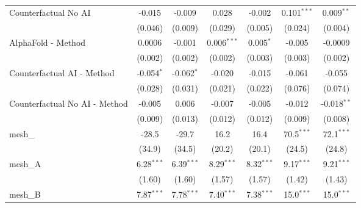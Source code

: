 \begin{tabular}{lcccccc}
   Counterfactual No AI                                        & -0.015         & -0.009        & 0.028         & -0.002        & 0.101$^{***}$ & 0.009$^{**}$\\   
                                                               & (0.046)        & (0.009)       & (0.029)       & (0.005)       & (0.024)       & (0.004)\\   
   AlphaFold - Method                                          & 0.0006         & -0.001        & 0.006$^{***}$ & 0.005$^{*}$   & -0.005        & -0.0009\\   
                                                               & (0.002)        & (0.002)       & (0.002)       & (0.003)       & (0.003)       & (0.002)\\   
   Counterfactual AI - Method                                  & -0.054$^{*}$   & -0.062$^{*}$  & -0.020        & -0.015        & -0.061        & -0.055\\   
                                                               & (0.028)        & (0.031)       & (0.021)       & (0.022)       & (0.076)       & (0.074)\\   
   Counterfactual No AI - Method                               & -0.005         & 0.006         & -0.007        & -0.005        & -0.012        & -0.018$^{**}$\\   
                                                               & (0.009)        & (0.013)       & (0.012)       & (0.012)       & (0.009)       & (0.008)\\   
   mesh\_                                                      & -28.5          & -29.7         & 16.2          & 16.4          & 70.5$^{***}$  & 72.1$^{***}$\\   
                                                               & (34.9)         & (34.5)        & (20.2)        & (20.1)        & (24.5)        & (24.8)\\   
   mesh\_A                                                     & 6.28$^{***}$   & 6.39$^{***}$  & 8.29$^{***}$  & 8.32$^{***}$  & 9.17$^{***}$  & 9.21$^{***}$\\   
                                                               & (1.60)         & (1.60)        & (1.57)        & (1.57)        & (1.42)        & (1.43)\\   
   mesh\_B                                                     & 7.87$^{***}$   & 7.78$^{***}$  & 7.40$^{***}$  & 7.38$^{***}$  & 15.0$^{***}$  & 15.0$^{***}$\\   

\end{tabular}
